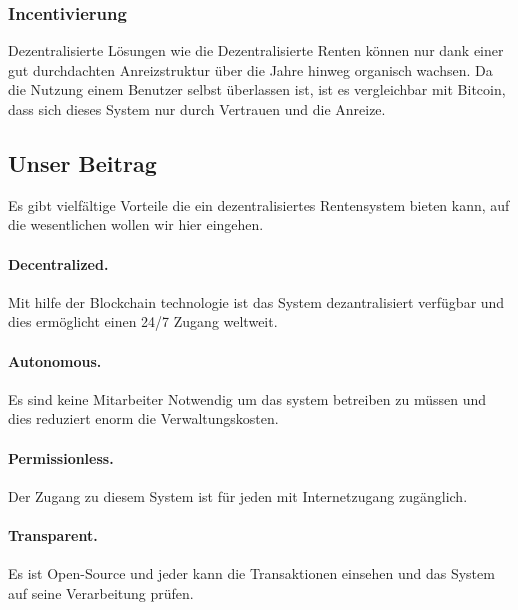 \subsubsection*{Incentivierung}


Dezentralisierte Lösungen wie die Dezentralisierte Renten können nur dank einer gut durchdachten Anreizstruktur über die Jahre hinweg organisch wachsen. Da die Nutzung einem Benutzer selbst überlassen ist, ist es vergleichbar mit Bitcoin\cite{bitcoin}, dass sich dieses System nur durch Vertrauen und die Anreize.


\subsection{Unser Beitrag}
Es gibt vielfältige Vorteile die ein dezentralisiertes Rentensystem bieten kann, auf die wesentlichen wollen wir hier eingehen.

\paragraph{Decentralized.} Mit hilfe der Blockchain technologie ist das System dezantralisiert verfügbar und dies ermöglicht einen 24/7 Zugang weltweit.

\paragraph{Autonomous.} Es sind keine Mitarbeiter Notwendig um das system betreiben zu müssen und dies reduziert enorm die Verwaltungskosten.

\paragraph{Permissionless.} Der Zugang zu diesem System ist für jeden mit Internetzugang zugänglich.

\paragraph{Transparent.} Es ist Open-Source und jeder kann die Transaktionen einsehen und das System auf seine Verarbeitung prüfen.

